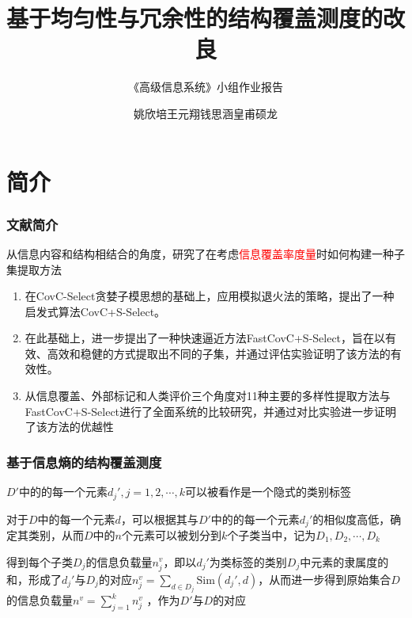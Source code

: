 \documentclass{../presentation}
\title{基于均匀性与冗余性的结构覆盖测度的改良}
\subtitle{《高级信息系统》小组作业报告}
\author{姚欣培\;王元翔\;钱思涵\;皇甫硕龙}
\newcommand{\Sim}{\text{Sim}}
\begin{document}
    \maketitle
    \small

    \section{简介}
    \begin{frame}
        \frametitle{文献简介}

        从信息内容和结构相结合的角度，研究了在考虑\textcolor{red}{信息覆盖率度量}时如何构建一种子集提取方法

        \begin{enumerate}
            \item 在CovC-Select贪婪子模思想的基础上，应用模拟退火法的策略，提出了一种启发式算法CovC+S-Select。

            \item 在此基础上，进一步提出了一种快速逼近方法FastCovC+S-Select，旨在以有效、高效和稳健的方式提取出不同的子集，并通过评估实验证明了该方法的有效性。

            \item 从信息覆盖、外部标记和人类评价三个角度对11种主要的多样性提取方法与FastCovC+S-Select进行了全面系统的比较研究，并通过对比实验进一步证明了该方法的优越性
        \end{enumerate}

    \end{frame}

    \begin{frame}
        \frametitle{基于信息熵的结构覆盖测度}

        $D'$中的的每一个元素$d_j', j=1,2,\cdots,k$可以被看作是一个隐式的类别标签

        对于$D$中的每一个元素$d$，可以根据其与$D'$中的的每一个元素$d_j'$的相似度高低，确定其类别，从而$D$中的$n$个元素可以被划分到$k$个子类当中，记为$D_1, D_2, \cdots ,D_k$

        得到每个子类$D_j$的信息负载量$n_j^v$，即以$d_j'$为类标签的类别$D_j$中元素的隶属度的和，形成了$d_j'$与$D_j$的对应$n_j^v=\sum_{d\in D_j}\Sim (d_j', d)$，从而进一步得到原始集合$D$的信息负载量$n^v=\sum _{j=1}^𝑘 n^v_j$ ，作为$D'$与$D$的对应

    \end{frame}
\end{document}
